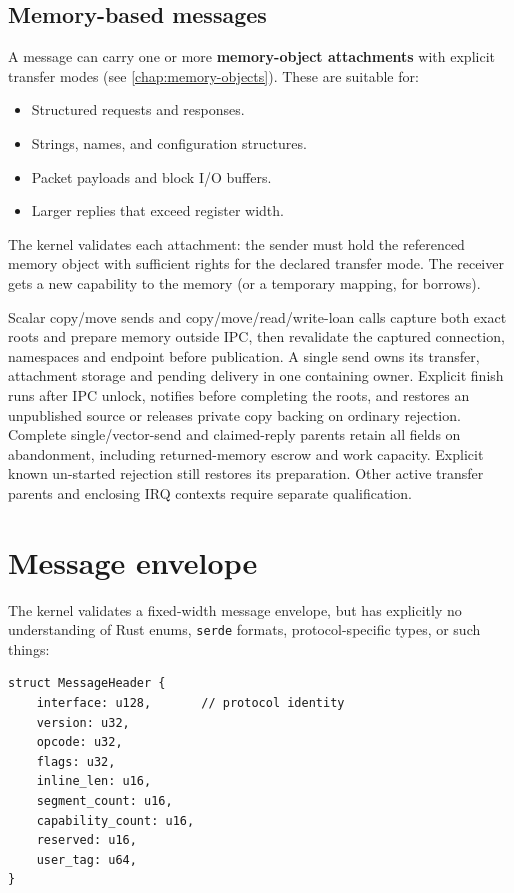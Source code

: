 \subsection{Memory-based messages}

A message can carry one or more \textbf{memory-object attachments} with explicit
transfer modes (see \autoref{chap:memory-objects}). These are suitable for:

\begin{itemize}
    \item Structured requests and responses.
    \item Strings, names, and configuration structures.
    \item Packet payloads and block I/O buffers.
    \item Larger replies that exceed register width.
\end{itemize}

The kernel validates each attachment: the sender must hold the referenced memory
object with sufficient rights for the declared transfer mode. The receiver gets a
new capability to the memory (or a temporary mapping, for borrows).

Scalar copy/move sends and copy/move/read/write-loan calls capture both exact
roots and prepare memory outside IPC, then revalidate the captured connection,
namespaces and endpoint before publication. A single send owns its transfer,
attachment storage and pending delivery in one containing owner. Explicit finish
runs after IPC unlock, notifies before completing the roots, and restores an
unpublished source or releases private copy backing on ordinary rejection.
Complete single/vector-send and claimed-reply parents retain all fields on
abandonment, including returned-memory escrow and work capacity. Explicit known
un-started rejection still restores its preparation. Other active transfer
parents and enclosing IRQ contexts require separate qualification.

\section{Message envelope}

The kernel validates a fixed-width message envelope, but has explicitly no
understanding of Rust enums, \texttt{serde} formats, protocol-specific types,
or such things:

\begin{lstlisting}[style=rustCode]
struct MessageHeader {
    interface: u128,       // protocol identity
    version: u32,
    opcode: u32,
    flags: u32,
    inline_len: u16,
    segment_count: u16,
    capability_count: u16,
    reserved: u16,
    user_tag: u64,
}
\end{lstlisting}

